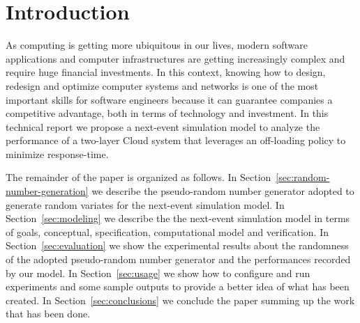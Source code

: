 \section{Introduction}
\label{sec:introduction}


As computing is getting more ubiquitous in our lives, modern software applications and computer infrastructures are getting increasingly complex and require huge financial investments.
%
In this context, knowing how to design, redesign and optimize computer systems and networks is one of the most important skills for software engineers because it can guarantee companies a competitive advantage, both in terms of technology and investment.
%
In this technical report we propose a next-event simulation model to analyze the performance of a two-layer Cloud system that leverages an off-loading policy to minimize response-time.


The remainder of the paper is organized as follows.
%
In Section~\ref{sec:random-number-generation} we describe the pseudo-random number generator adopted to generate random variates for the next-event simulation model.
%
In Section~\ref{sec:modeling} we describe the the next-event simulation model in terms of goals, conceptual, specification, computational model and verification.
%
In Section~\ref{sec:evaluation} we show the experimental results about the randomness of the adopted pseudo-random number generator and the performances recorded by our model.
%
In Section~\ref{sec:usage} we show how to configure and run experiments and some sample outputs to provide a better idea of what has been created.
%
In Section~\ref{sec:conclusions} we conclude the paper summing up the work that has been done.

